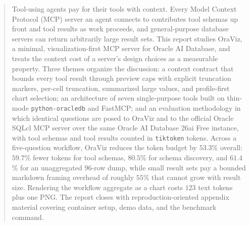 \begin{abstract}
Tool-using agents pay for their tools with context. Every Model Context Protocol (MCP) server an agent connects to contributes tool schemas up front and tool results as work proceeds, and general-purpose database servers can return arbitrarily large result sets. This report studies OraViz, a minimal, visualization-first MCP server for Oracle AI Database, and treats the context cost of a server's design choices as a measurable property. Three themes organize the discussion: a context contract that bounds every tool result through preview caps with explicit truncation markers, per-cell truncation, summarized large values, and profile-first chart selection; an architecture of seven single-purpose tools built on thin-mode \texttt{python-oracledb} and FastMCP; and an evaluation methodology in which identical questions are posed to OraViz and to the official Oracle SQLcl MCP server over the same Oracle AI Database 26ai Free instance, with tool schemas and tool results counted in \texttt{tiktoken} tokens. Across a five-question workflow, OraViz reduces the token budget by $53.3$\% overall: $59.7$\% fewer tokens for tool schemas, $80.5$\% for schema discovery, and $61.4$\% for an unaggregated $96$-row dump, while small result sets pay a bounded markdown framing overhead of roughly $55$\% that cannot grow with result size. Rendering the workflow aggregate as a chart costs $123$ text tokens plus one PNG. The report closes with reproduction-oriented appendix material covering container setup, demo data, and the benchmark command.
\end{abstract}
